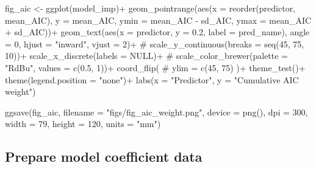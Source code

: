 \documentclass[]{article}
\newenvironment{Shaded}{}{}
\newcommand{\CommentTok}[1]{\textcolor[rgb]{0.00,0.50,0.00}{#1}}
\newcommand{\DataTypeTok}[1]{#1}
\newcommand{\DecValTok}[1]{#1}
\newcommand{\FloatTok}[1]{#1}
\newcommand{\KeywordTok}[1]{\textcolor[rgb]{0.00,0.00,1.00}{#1}}
\newcommand{\NormalTok}[1]{#1}
\newcommand{\OperatorTok}[1]{#1}
\newcommand{\OtherTok}[1]{\textcolor[rgb]{1.00,0.25,0.00}{#1}}
\newcommand{\StringTok}[1]{\textcolor[rgb]{0.00,0.50,0.50}{#1}}
\begin{document}
\begin{Shaded}
\begin{Highlighting}[]
\NormalTok{fig_aic <-}
\StringTok{  }\KeywordTok{ggplot}\NormalTok{(model_imp)}\OperatorTok{+}
\StringTok{  }\KeywordTok{geom_pointrange}\NormalTok{(}\KeywordTok{aes}\NormalTok{(}\DataTypeTok{x =} \KeywordTok{reorder}\NormalTok{(predictor, mean_AIC),}
                      \DataTypeTok{y =}\NormalTok{ mean_AIC,}
                      \DataTypeTok{ymin =}\NormalTok{ mean_AIC }\OperatorTok{-}\StringTok{ }\NormalTok{sd_AIC,}
                      \DataTypeTok{ymax =}\NormalTok{ mean_AIC }\OperatorTok{+}\StringTok{ }\NormalTok{sd_AIC))}\OperatorTok{+}
\StringTok{  }\KeywordTok{geom_text}\NormalTok{(}\KeywordTok{aes}\NormalTok{(}\DataTypeTok{x =}\NormalTok{ predictor, }
                \DataTypeTok{y =} \FloatTok{0.2}\NormalTok{,}
                \DataTypeTok{label =}\NormalTok{ pred_name),}
            \DataTypeTok{angle =} \DecValTok{0}\NormalTok{,}
            \DataTypeTok{hjust =} \StringTok{"inward"}\NormalTok{,}
            \DataTypeTok{vjust =} \DecValTok{2}\NormalTok{)}\OperatorTok{+}
\StringTok{  }\CommentTok{# scale_y_continuous(breaks = seq(45, 75, 10))+}
\StringTok{  }\KeywordTok{scale_x_discrete}\NormalTok{(}\DataTypeTok{labels =} \OtherTok{NULL}\NormalTok{)}\OperatorTok{+}
\StringTok{  }\CommentTok{# scale_color_brewer(palette = "RdBu", values = c(0.5, 1))+}
\StringTok{  }\KeywordTok{coord_flip}\NormalTok{(}
    \CommentTok{# ylim = c(45, 75)}
\NormalTok{  )}\OperatorTok{+}
\StringTok{  }\KeywordTok{theme_test}\NormalTok{()}\OperatorTok{+}
\StringTok{  }\KeywordTok{theme}\NormalTok{(}\DataTypeTok{legend.position =} \StringTok{"none"}\NormalTok{)}\OperatorTok{+}
\StringTok{  }\KeywordTok{labs}\NormalTok{(}\DataTypeTok{x =} \StringTok{"Predictor"}\NormalTok{,}
       \DataTypeTok{y =} \StringTok{"Cumulative AIC weight"}\NormalTok{)}

\KeywordTok{ggsave}\NormalTok{(fig_aic,}
       \DataTypeTok{filename =} \StringTok{"figs/fig_aic_weight.png"}\NormalTok{, }
       \DataTypeTok{device =} \KeywordTok{png}\NormalTok{(),}
       \DataTypeTok{dpi =} \DecValTok{300}\NormalTok{,}
       \DataTypeTok{width =} \DecValTok{79}\NormalTok{, }\DataTypeTok{height =} \DecValTok{120}\NormalTok{, }\DataTypeTok{units =} \StringTok{"mm"}\NormalTok{)}
\end{Highlighting}
\end{Shaded}

\hypertarget{prepare-model-coefficient-data}{%
\subsection{Prepare model coefficient data}\label{prepare-model-coefficient-data}}
\end{document}
